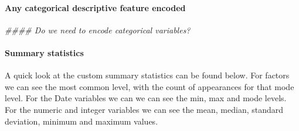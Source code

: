\documentclass[12pt]{article}
\newenvironment{Shaded}{\begin{snugshade}}{\end{snugshade}}
\newcommand{\CommentTok}[1]{\textcolor[rgb]{0.56,0.35,0.01}{\textit{#1}}}
\newcommand{\DataTypeTok}[1]{\textcolor[rgb]{0.13,0.29,0.53}{#1}}
\newcommand{\KeywordTok}[1]{\textcolor[rgb]{0.13,0.29,0.53}{\textbf{#1}}}
\newcommand{\NormalTok}[1]{#1}
\newcommand{\OperatorTok}[1]{\textcolor[rgb]{0.81,0.36,0.00}{\textbf{#1}}}
\newcommand{\StringTok}[1]{\textcolor[rgb]{0.31,0.60,0.02}{#1}}
\begin{document}
\hypertarget{any-categorical-descriptive-feature-encoded}{%
\paragraph{Any categorical descriptive feature
encoded}\label{any-categorical-descriptive-feature-encoded}}

\begin{Shaded}
\begin{Highlighting}[]
\CommentTok{#### Do we need to encode categorical variables?}
\end{Highlighting}
\end{Shaded}

\hypertarget{summary-statistics}{%
\paragraph{Summary statistics}\label{summary-statistics}}

A quick look at the custom summary statistics can be found below. For
factors we can see the most common level, with the count of appearances
for that mode level. For the Date variables we can we can see the min,
max and mode levels. For the numeric and integer variables we can see
the mean, median, standard deviation, minimum and maximum values.

\begin{Shaded}
\end{Shaded}
\end{document}
